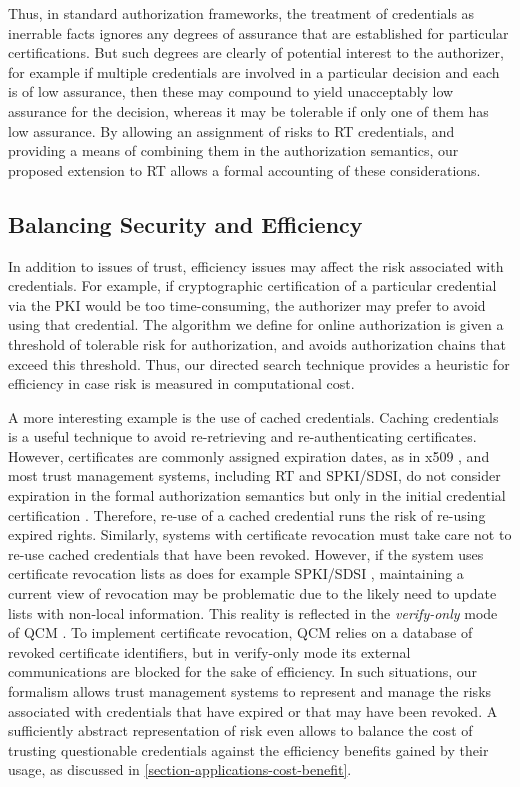 Thus, in standard authorization frameworks, the treatment of
credentials as inerrable facts ignores any degrees of assurance that
are established for particular certifications.  But such degrees are
clearly of potential interest to the authorizer, for example if
multiple credentials are involved in a particular decision and each is
of low assurance, then these may compound to yield unacceptably low
assurance for the decision, whereas it may be tolerable if only one of
them has low assurance.  By allowing an assignment of risks to RT
credentials, and providing a means of combining them in the
authorization semantics, our proposed extension to RT allows a formal
accounting of these considerations.

\subsection{Balancing Security and Efficiency}

In addition to issues of trust, efficiency issues may affect the risk
associated with credentials.  For example, if cryptographic
certification of a particular credential via the PKI would be too
time-consuming, the authorizer may prefer to avoid using that
credential.  The algorithm we define for online authorization is given
a threshold of tolerable risk for authorization, and avoids
authorization chains that exceed this threshold.  Thus, our directed
search technique provides a heuristic for efficiency in case risk is
measured in computational cost.

A more interesting example is the use of cached credentials.  Caching
credentials is a useful technique to avoid re-retrieving and
re-authenticating certificates.  However, certificates are commonly
assigned expiration dates, as in x509 \cite{X509}, and most trust
management systems, including RT and SPKI/SDSI, do not consider
expiration in the formal authorization semantics but only in the
initial credential certification \cite{ellison-etal-rfc99}.
Therefore, re-use of a cached credential runs the risk of re-using
expired rights.  Similarly, systems with certificate revocation must
take care not to re-use cached credentials that have been revoked.
However, if the system uses certificate revocation lists as does for
example SPKI/SDSI \cite{ellison-etal-rfc99}, maintaining a current
view of revocation may be problematic due to the likely need to update
lists with non-local information.  This reality is reflected in the
\emph{verify-only} mode of QCM \cite{Gunter:PDCR}. To implement
certificate revocation, QCM relies on a database of revoked
certificate identifiers, but in verify-only mode its external
communications are blocked for the sake of efficiency.  In such
situations, our formalism allows trust management systems to represent
and manage the risks associated with credentials that have expired or
that may have been revoked.  A sufficiently abstract representation of
risk even allows to balance the cost of trusting questionable
credentials against the efficiency benefits gained by their usage, as
discussed in \autoref{section-applications-cost-benefit}.
    
